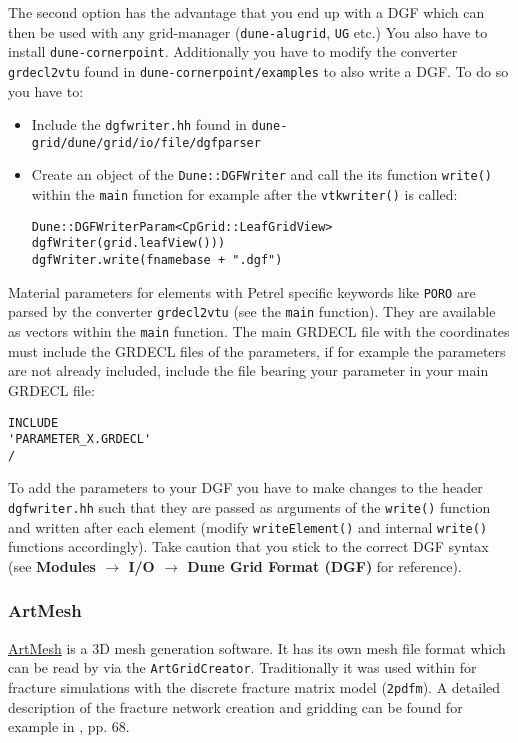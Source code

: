 The second option has the advantage that you end up with a DGF which can then be used with any grid-manager (\texttt{dune-alugrid}, \texttt{UG} etc.) You also have to install \texttt{dune-cornerpoint}. Additionally you have to modify the converter \texttt{grdecl2vtu} found in \texttt{dune-cornerpoint/examples} to also write a DGF. To do so you have to:
\begin{itemize}
 \item Include the \texttt{dgfwriter.hh} found in \texttt{dune-grid/dune/grid/io/file/dgfparser}
 \item Create an object of the \texttt{Dune::DGFWriter} and call the its function \texttt{write()} within the \texttt{main} function for example after the \texttt{vtkwriter()} is called:
\begin{lstlisting}[style=DumuxCode]
Dune::DGFWriterParam<CpGrid::LeafGridView> dgfWriter(grid.leafView()))
dgfWriter.write(fnamebase + ".dgf")
\end{lstlisting}
\end{itemize}
Material parameters for elements with Petrel specific keywords like \texttt{PORO} are parsed by the converter \texttt{grdecl2vtu} (see the \texttt{main} function). They are available as vectors within the \texttt{main} function. The main GRDECL file with the coordinates must include the GRDECL files of the parameters, if for example the parameters are not already included, include the file bearing your parameter in your main GRDECL file:
\begin{lstlisting}
INCLUDE
'PARAMETER_X.GRDECL'
/
\end{lstlisting}
To add the parameters to your DGF you have to make changes to the header \texttt{dgfwriter.hh} such that they are passed as arguments of the \texttt{write()} function and written after each element (modify \texttt{writeElement()} and internal \texttt{write()} functions accordingly). Take caution that you stick to the correct DGF syntax (see \textbf{Modules $\rightarrow$ I/O $\rightarrow$ Dune Grid Format (DGF)} for reference).

\subsubsection{ArtMesh}
\href{http://www.topologica.org/toplog/wp/}{ArtMesh} is a 3D mesh generation software. It has its own mesh file format
which can be read by \Dumux via the \texttt{ArtGridCreator}. Traditionally it was used within \Dumux for fracture simulations with
the discrete fracture matrix model (\texttt{2pdfm}). A detailed description of the fracture network creation and gridding
can be found for example in \cite{Tatomir2012a}, pp. 68.


